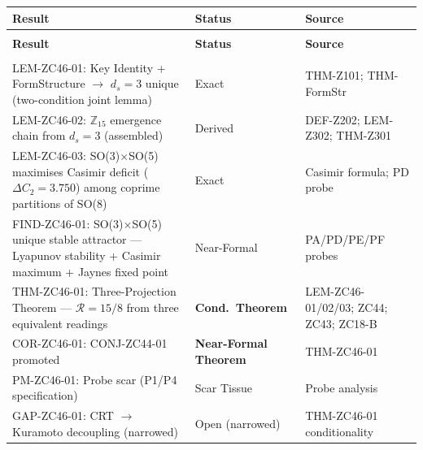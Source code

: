 \documentclass[12pt, a4paper]{article}
\begin{document}
\bigskip

{\small
\setlength{\LTpre}{4pt}\setlength{\LTpost}{4pt}
\renewcommand{\arraystretch}{1.30}
\begin{longtable}{>{\raggedright\arraybackslash}p{5.4cm}
                  >{\centering\arraybackslash}p{2.8cm}
                  >{\raggedright\arraybackslash}p{4.0cm}}
\toprule
\textbf{Result} & \textbf{Status} & \textbf{Source}\\
\midrule
\endfirsthead
\multicolumn{3}{l}{\small\textit{(continued)}}\\[4pt]
\toprule
\textbf{Result} & \textbf{Status} & \textbf{Source}\\
\midrule
\endhead
\midrule
\multicolumn{3}{r}{\small\textit{(continues)}}\\
\endfoot
\bottomrule
\endlastfoot

LEM-ZC46-01: Key Identity + FormStructure $\to$
  $d_s=3$ unique (two-condition joint lemma) &
  Exact & THM-Z101; THM-FormStr\\

LEM-ZC46-02: $\mathbb{Z}_{15}$ emergence chain
  from $d_s=3$ (assembled) &
  Derived & DEF-Z202; LEM-Z302; THM-Z301\\

LEM-ZC46-03: SO(3)$\times$SO(5) maximises Casimir
  deficit ($\Delta C_2 = 3.750$) among coprime
  partitions of SO(8) &
  Exact & Casimir formula; PD probe\\

FIND-ZC46-01: SO(3)$\times$SO(5) unique stable attractor
  --- Lyapunov stability + Casimir maximum + Jaynes
  fixed point &
  Near-Formal & PA/PD/PE/PF probes\\

THM-ZC46-01: Three-Projection Theorem ---
  $\mathcal{R}=15/8$ from three equivalent readings &
  \textbf{Cond.\ Theorem} & LEM-ZC46-01/02/03;
  ZC44; ZC43; ZC18-B\\

COR-ZC46-01: CONJ-ZC44-01 promoted &
  \textbf{Near-Formal Theorem} & THM-ZC46-01\\

PM-ZC46-01: Probe scar (P1/P4 specification) &
  Scar Tissue & Probe analysis\\

GAP-ZC46-01: CRT $\to$ Kuramoto decoupling (narrowed) &
  Open (narrowed) & THM-ZC46-01 conditionality\\

\end{longtable}
}
\vspace{-\parskip}
\end{document}
